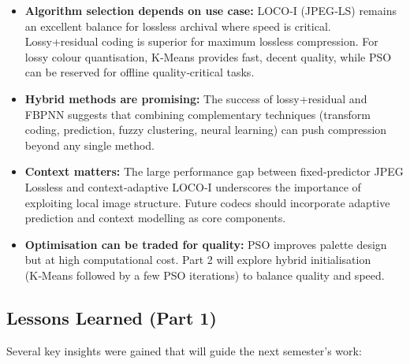 \begin{itemize}
    \item \textbf{Algorithm selection depends on use case:} LOCO‑I (JPEG‑LS) remains an excellent balance for lossless archival where speed is critical. Lossy+residual coding is superior for maximum lossless compression. For lossy colour quantisation, K‑Means provides fast, decent quality, while PSO can be reserved for offline quality‑critical tasks.
    \item \textbf{Hybrid methods are promising:} The success of lossy+residual and FBPNN suggests that combining complementary techniques (transform coding, prediction, fuzzy clustering, neural learning) can push compression beyond any single method.
    \item \textbf{Context matters:} The large performance gap between fixed‑predictor JPEG Lossless and context‑adaptive LOCO‑I underscores the importance of exploiting local image structure. Future codecs should incorporate adaptive prediction and context modelling as core components.
    \item \textbf{Optimisation can be traded for quality:} PSO improves palette design but at high computational cost. Part 2 will explore hybrid initialisation (K‑Means followed by a few PSO iterations) to balance quality and speed.
\end{itemize}

\subsection{Lessons Learned (Part 1)}

Several key insights were gained that will guide the next semester’s work:

